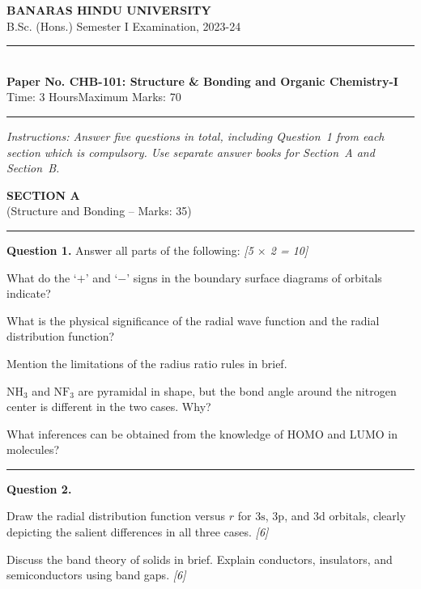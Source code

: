 \documentclass[11pt,a4paper]{article}
\newcommand{\pts}[1]{\hfill   \textit{[#1]}}
\begin{document}
\begin{center}
  {\large\bfseries BANARAS HINDU UNIVERSITY}\\[2pt]
  {\normalsize B.Sc. (Hons.) Semester I Examination, 2023-24}\\[6pt]
  \rule{0.8\linewidth}{0.5pt}\\[6pt]
  {\large\bfseries Paper No. CHB-101: Structure \& Bonding and Organic Chemistry-I}\\[4pt]
  {\normalsize Time: 3 Hours\hfill Maximum Marks: 70}
\end{center}
\rule{\linewidth}{0.4pt}
\small



\noindent   \textit{Instructions: Answer five questions in total, including Question~1 from each section which is compulsory. Use separate answer books for Section~A and Section~B.}

\normalsize
\bigskip


\begin{center}
  {\large\bfseries SECTION A}\\[2pt]
  {\normalsize (Structure and Bonding -- Marks: 35)}
\end{center}
\rule{0.4\linewidth}{0.2pt}
\smallskip




\noindent   \textbf{Question 1.} Answer all parts of the following: \pts{5 $ \times$ 2 = 10}

\begin{parts}
  \item What do the `$+$' and `$-$' signs in the boundary surface diagrams of orbitals indicate?
  \item What is the physical significance of the radial wave function and the radial distribution function?
  \item Mention the limitations of the radius ratio rules in brief.
  \item $ \text{NH}_3$ and $ \text{NF}_3$ are pyramidal in shape, but the bond angle around the nitrogen center is different in the two cases. Why?
  \item What inferences can be obtained from the knowledge of HOMO and LUMO in molecules?
\end{parts}

\medskip\rule{\linewidth}{0.2pt}




\noindent   \textbf{Question 2.}

\begin{parts}
  \item Draw the radial distribution function versus $r$ for $3 \text{s}$, $3 \text{p}$, and $3 \text{d}$ orbitals, clearly depicting the salient differences in all three cases. \pts{6}
  \item Discuss the band theory of solids in brief. Explain conductors, insulators, and semiconductors using band gaps. \pts{6}
\end{parts}
\end{document}
